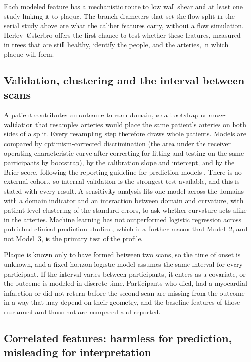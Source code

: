 Each modeled feature has a mechanistic route to low wall shear and at least one study linking it to plaque.
The branch diameters that set the flow split in the serial study above \cite{sakellarios2017bifurcation} are what the caliber features carry, without a flow simulation.
Herlev--{\O}sterbro offers the first chance to test whether these features, measured in trees that are still healthy, identify the people, and the arteries, in which plaque will form.

\subsection{Validation, clustering and the interval between scans}
\label{sec:risk-validation}

A patient contributes an outcome to each domain, so a bootstrap or cross-validation that resamples arteries would place the same patient's arteries on both sides of a split.
Every resampling step therefore draws whole patients.
Models are compared by optimism-corrected discrimination (the area under the receiver operating characteristic curve after correcting for fitting and testing on the same participants by bootstrap), by the calibration slope and intercept, and by the Brier score, following the reporting guideline for prediction models \cite{collins2024tripodai}.
There is no external cohort, so internal validation is the strongest test available, and this is stated with every result.
A sensitivity analysis fits one model across the domains with a domain indicator and an interaction between domain and curvature, with patient-level clustering of the standard errors, to ask whether curvature acts alike in the arteries.
Machine learning has not outperformed logistic regression across published clinical prediction studies \cite{christodoulou2019systematic}, which is a further reason that Model~2, and not Model~3, is the primary test of the profile.

Plaque is known only to have formed between two scans, so the time of onset is unknown, and a fixed-horizon logistic model assumes the same interval for every participant.
If the interval varies between participants, it enters as a covariate, or the outcome is modeled in discrete time.
Participants who died, had a myocardial infarction or did not return before the second scan are missing from the outcome in a way that may depend on their geometry, and the baseline features of those rescanned and those not are compared and reported.

\subsection{Correlated features: harmless for prediction, misleading for interpretation}
\label{sec:risk-collinearity}

